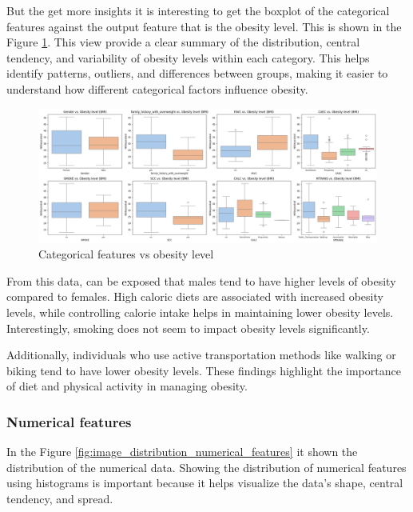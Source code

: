 \documentclass[11pt, a4paper]{article}
\begin{document}
But the get more insights it is interesting to get the boxplot of the categorical features against the output feature that is the obesity level.
This is shown in the Figure \ref{fig:image_categorical_features_vs_obesity_level}. This view provide a clear summary of the distribution, 
central tendency, and variability of obesity levels within each category. This helps identify patterns, outliers, and differences between groups, 
making it easier to understand how different categorical factors influence obesity.

\begin{figure}[H]
    \centering
    \includegraphics[width=\textwidth]{images/categorical_features_vs_obesity_level.png}
    \caption{Categorical features vs obesity level}
    \label{fig:image_categorical_features_vs_obesity_level}
\end{figure}

From this data, can be exposed that males tend to have higher levels of obesity compared to females. High caloric diets are associated with increased 
obesity levels, while controlling calorie intake helps in maintaining lower obesity levels. Interestingly, smoking does not seem to impact obesity levels 
significantly.

\vspace{1em}Additionally, individuals who use active transportation methods like walking or biking tend to have lower obesity levels. These findings 
highlight the importance of diet and physical activity in managing obesity.

\subsubsection{Numerical features}

In the Figure \ref{fig:image_distribution_numerical_features} it shown the distribution of the numerical data. Showing the distribution of numerical 
features using histograms is important because it helps visualize the data's shape, central tendency, and spread.
\end{document}
